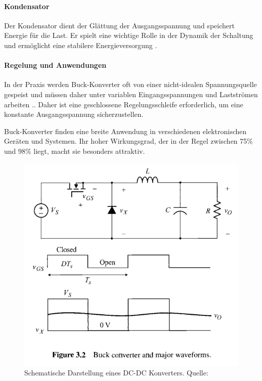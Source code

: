 \paragraph{Kondensator}
Der Kondensator dient der Glättung der Ausgangsspannung und speichert Energie für die Last. Er spielt eine wichtige Rolle in der Dynamik der Schaltung und ermöglicht eine stabilere Energieversorgung \cite[p.~54]{Kularatna2012}.
\paragraph{Regelung und Anwendungen}

In der Praxis werden Buck-Konverter oft von einer nicht-idealen Spannungsquelle gespeist und müssen daher unter variablen Eingangsspannungen und Lastströmen arbeiten \cite[p.~124,120,113]{choi2013pulsewidth}.. Daher ist eine geschlossene Regelungsschleife erforderlich, um eine konstante Ausgangsspannung sicherzustellen.

Buck-Konverter finden eine breite Anwendung in verschiedenen elektronischen Geräten und Systemen. Ihr hoher Wirkungsgrad, der in der Regel zwischen 75\% und 98\% liegt, macht sie besonders attraktiv.


\begin{figure}[htbp]
    \centering
    \includegraphics[width=0.4\linewidth]{2Grundlagen/111DCDC.png}
    \caption{Schematische Darstellung eines DC-DC Konverters. Quelle: \cite[Seite 88]{choi2013pulsewidth}}
    \label{fig:dcdc_converter}
\end{figure}



